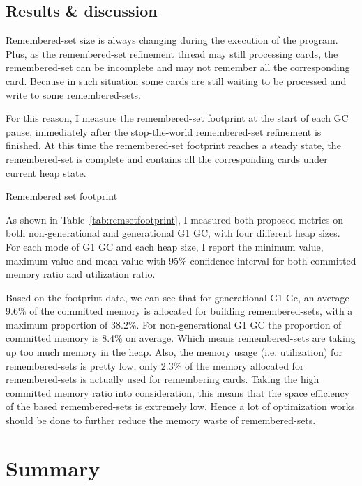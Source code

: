 \subsection{Results \& discussion}

Remembered-set size is always changing during the execution of the program.
Plus, as the remembered-set refinement thread may still processing cards,
the remembered-set can be incomplete and may not remember all the corresponding card.
Because in such situation some cards are still waiting to
be processed and write to some remembered-sets.

For this reason, I measure the remembered-set footprint at the start of each GC pause, immediately after
the stop-the-world remembered-set refinement is finished. At this time the remembered-set
footprint reaches a steady state, the remembered-set is complete and contains
all the corresponding cards under current heap state.

\begin{table*}
  \centering
  
  \caption{Remembered set footprint}
  \label{tab:remsetfootprint}
\end{table*}

As shown in Table~\ref{tab:remsetfootprint}, I measured both proposed metrics
on both non-generational and generational G1 GC, with four different heap sizes.
For each mode of G1 GC and each heap size, I report the minimum value, maximum value and mean value
with 95\% confidence interval for both committed memory ratio and utilization ratio.

Based on the footprint data, we can see that for generational G1 Gc,
an average 9.6\% of the committed memory
is allocated for building remembered-sets, with a maximum proportion of 38.2\%.
For non-generational G1 GC the proportion of committed memory is 8.4\% on average.
Which means remembered-sets are taking up too much memory in the heap. 
Also, the memory usage (i.e. utilization) for remembered-sets is pretty low,
only 2.3\% of the memory allocated for remembered-sets is actually used for remembering cards.
Taking the high committed memory ratio into consideration, this means that the
space efficiency of the  based remembered-sets is extremely
low. Hence a lot of optimization works should be done to further reduce the memory
waste of remembered-sets.

\section{Summary} %
\label{sec:summary}

